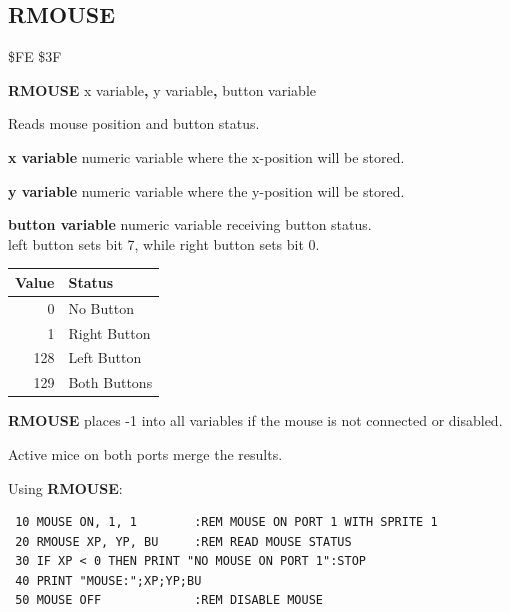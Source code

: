 \subsection{RMOUSE}
\begin{description}[leftmargin=2cm,style=nextline]
\item [Token:] \$FE \$3F
\item [Format:] {\bf RMOUSE} x variable{\bf,} y variable{\bf,} button variable
\item [Usage:] Reads mouse position and button status.

               {\bf x variable} numeric variable where the x-position will be stored.

               {\bf y variable} numeric variable where the y-position will be stored.

               {\bf button variable} numeric variable receiving button status. \\
               left button sets bit 7, while right button sets bit 0.

\begin{center}
{\setlength{\tabcolsep}{1mm}
\begin{tabular}{|r|l|}
\hline
{\bf Value}  & {\bf Status} \\
\hline
0   & No Button \\
1   & Right Button \\
128 & Left Button \\
129 & Both Buttons \\
\hline
\end{tabular}
}
\end{center}

{\bf RMOUSE} places -1 into all variables
if the mouse is not connected or disabled.

\item [Remarks:] Active mice on both ports merge the results.
\item [Example:] Using {\bf RMOUSE}:
\begin{tcolorbox}[colback=black,coltext=white]
\verbatimfont{\codefont}
\begin{verbatim}
 10 MOUSE ON, 1, 1        :REM MOUSE ON PORT 1 WITH SPRITE 1
 20 RMOUSE XP, YP, BU     :REM READ MOUSE STATUS
 30 IF XP < 0 THEN PRINT "NO MOUSE ON PORT 1":STOP
 40 PRINT "MOUSE:";XP;YP;BU
 50 MOUSE OFF             :REM DISABLE MOUSE
\end{verbatim}
\end{tcolorbox}
\end{description}

